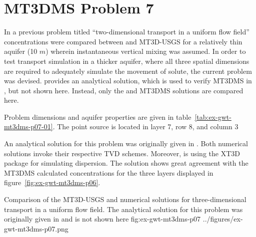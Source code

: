 \section{MT3DMS Problem 7}

In a previous problem titled ``two-dimensional transport in a uniform flow field'' concentrations were compared between \mf and MT3D-USGS for a relatively thin aquifer (10 $m$) wherein instantaneous vertical mixing was assumed.  In order to test transport simulation in a thicker aquifer, where all three spatial dimensions are required to adequately simulate the movement of solute, the current problem was devised. \cite{hunt1978} provides an analytical solution, which is used to verify MT3DMS in \cite{zheng1999mt3dms}, but not shown here.  Instead, only the \mf and MT3DMS solutions are compared here. 

Problem dimensions and aquifer properties are given in table~\ref{tab:ex-gwt-mt3dms-p07-01}.  The point source is located in layer 7, row 8, and column 3



An analytical solution for this problem was originally given in \cite{hunt1978}.  Both numerical solutions invoke their respective TVD schemes.  Moreover, \mf is using the XT3D package for simulating dispersion.  The \mf solution shows great agreement with the MT3DMS calculated concentrations for the three layers displayed in figure~\ref{fig:ex-gwt-mt3dms-p06}. 

\begin{StandardFigure}
	{Comparison of the MT3D-USGS and \mf numerical solutions for three-dimensional transport in a uniform flow field. The analytical solution for this problem was originally given in \citep{hunt1978} and is not shown here} 
	{fig:ex-gwt-mt3dms-p07}
	{../figures/ex-gwt-mt3dms-p07.png}
\end{StandardFigure}

